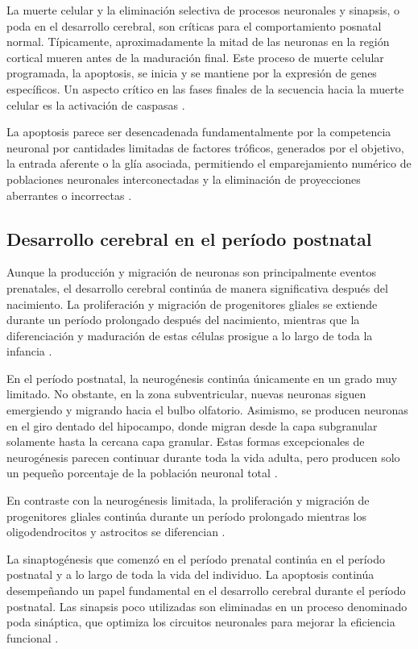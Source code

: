La muerte celular y la eliminación selectiva de procesos neuronales y sinapsis,
o poda en el desarrollo cerebral, son críticas para el comportamiento posnatal
normal. Típicamente, aproximadamente la mitad de las neuronas en la región
cortical mueren antes de la maduración final. Este proceso de muerte celular
programada, la apoptosis, se inicia y se mantiene por la expresión de genes
específicos. Un aspecto crítico en las fases finales de la secuencia hacia la
muerte celular es la activación de caspasas \cite{Polin124}.

La apoptosis parece ser desencadenada fundamentalmente por la competencia
neuronal por cantidades limitadas de factores tróficos, generados por el
objetivo, la entrada aferente o la glía asociada, permitiendo el emparejamiento
numérico de poblaciones neuronales interconectadas y la eliminación de
proyecciones aberrantes o incorrectas \cite{Polin124}.

\subsection{Desarrollo cerebral en el período postnatal}
Aunque la producción y migración de neuronas son principalmente eventos
prenatales, el desarrollo cerebral continúa de manera significativa después del
nacimiento. La proliferación y migración de progenitores gliales se extiende
durante un período prolongado después del nacimiento, mientras que la
diferenciación y maduración de estas células prosigue a lo largo de toda la
infancia \cite{Stiles2010}.

En el período postnatal, la neurogénesis continúa únicamente en un grado muy
limitado. No obstante, en la zona subventricular, nuevas neuronas siguen
emergiendo y migrando hacia el bulbo olfatorio. Asimismo, se producen neuronas
en el giro dentado del hipocampo, donde migran desde la capa subgranular
solamente hasta la cercana capa granular. Estas formas excepcionales de
neurogénesis parecen continuar durante toda la vida adulta, pero producen solo
un pequeño porcentaje de la población neuronal total \cite{Stiles2010}.

En contraste con la neurogénesis limitada, la proliferación y migración de
progenitores gliales continúa durante un período prolongado mientras los
oligodendrocitos y astrocitos se diferencian \cite{Stiles2010}.

La sinaptogénesis que comenzó en el período prenatal continúa en el período
postnatal y a lo largo de toda la vida del individuo. La apoptosis continúa
desempeñando un papel fundamental en el desarrollo cerebral durante el período
postnatal. Las sinapsis poco utilizadas son eliminadas en un proceso denominado
poda sináptica, que optimiza los circuitos neuronales para mejorar la
eficiencia funcional \cite{Gibb2018}.

